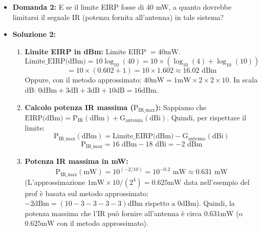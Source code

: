 \begin{itemize}
    \item \textbf{Domanda 2:} E se il limite EIRP fosse di 40 mW, a quanto dovrebbe limitarsi il segnale IR (potenza fornita all'antenna) in tale sistema?
    \item \textbf{Soluzione 2:}
    \begin{enumerate}
        \item \textbf{Limite EIRP in dBm:}
        Limite EIRP $= 40\text{mW}$.
        \[ \text{Limite\_EIRP(dBm)} = 10 \log_{10}(40) = 10 \times (\log_{10}(4) + \log_{10}(10)) \]
        \[ = 10 \times (0.602 + 1) = 10 \times 1.602 \approx 16.02 \text{ dBm} \]
        Oppure, con il metodo approssimato: $40\text{mW} = 1\text{mW} \times 2 \times 2 \times 10$.
        In scala dB: $0\text{dBm} + 3\text{dB} + 3\text{dB} + 10\text{dB} = 16\text{dBm}$.
        \item \textbf{Calcolo potenza IR massima ($\text{P}_{\text{IR\_max}}$):}
        Sappiamo che $\text{EIRP(dBm)} = \text{P}_{\text{IR}}(\text{dBm}) + \text{G}_{\text{antenna}}(\text{dBi})$.
        Quindi, per rispettare il limite:
        \[ \text{P}_{\text{IR\_max}}(\text{dBm}) = \text{Limite\_EIRP(dBm)} - \text{G}_{\text{antenna}}(\text{dBi}) \]
        \[ \text{P}_{\text{IR\_max}} = 16 \text{ dBm} - 18 \text{ dBi} = -2 \text{ dBm} \]
        \item \textbf{Potenza IR massima in mW:}
        \[ \text{P}_{\text{IR\_max}}(\text{mW}) = 10^{(-2/10)} = 10^{-0.2} \text{ mW} \approx 0.631 \text{ mW} \]
        (L'approssimazione $1\text{mW} \times 10 / (2^4) = 0.625 \text{mW}$ data nell'esempio del prof è basata sul metodo approssimato: $-2\text{dBm} = (10 - 3 - 3 - 3 - 3)\text{dBm}$ rispetto a $0\text{dBm}$).
        Quindi, la potenza massima che l'IR può fornire all'antenna è circa $0.631 \text{mW}$ (o $0.625 \text{mW}$ con il metodo approssimato).
    \end{enumerate}
\end{itemize}

